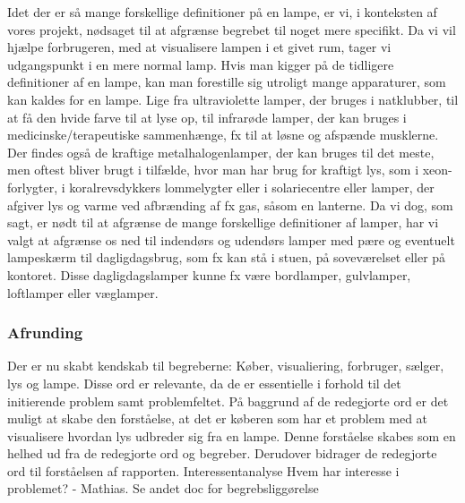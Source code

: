 Idet der er så mange forskellige definitioner på en lampe, er vi, i konteksten af vores projekt, nødsaget til at afgrænse begrebet til noget mere specifikt. Da vi vil hjælpe forbrugeren, med at visualisere lampen i et givet rum, tager vi udgangspunkt i en mere normal lamp. Hvis man kigger på de tidligere definitioner af en lampe, kan man forestille sig utroligt mange apparaturer, som kan kaldes for en lampe. Lige fra ultraviolette lamper, der bruges i natklubber, til at få den hvide farve til at lyse op, til infrarøde lamper, der kan bruges i medicinske/terapeutiske sammenhænge, fx til at løsne og afspænde musklerne. Der findes også de kraftige metalhalogenlamper, der kan bruges til det meste, men oftest bliver brugt i tilfælde, hvor man har brug for kraftigt lys, som i xeon-forlygter, i koralrevsdykkers lommelygter eller i solariecentre \cite{metal_lamper} eller lamper, der afgiver lys og varme ved afbrænding af fx gas, såsom en lanterne. Da vi dog, som sagt, er nødt til at afgrænse de mange forskellige definitioner af lamper, har vi valgt at afgrænse os ned til indendørs og udendørs lamper med pære og eventuelt lampeskærm til dagligdagsbrug, som fx kan stå i stuen, på soveværelset eller på kontoret. Disse dagligdagslamper kunne fx være bordlamper, gulvlamper, loftlamper eller væglamper. 

\subsubsection{Afrunding}
Der er nu skabt kendskab til begreberne: Køber, visualiering, forbruger, sælger,  lys og lampe. Disse ord er relevante, da de er essentielle i forhold til det initierende problem samt problemfeltet. På baggrund af de redegjorte ord er det muligt at skabe den forståelse, at det er køberen som har et problem med at visualisere hvordan lys udbreder sig fra en lampe. Denne forståelse skabes som en helhed ud fra de redegjorte ord og begreber. 
Derudover bidrager de redegjorte ord til forståelsen af rapporten.
Interessentanalyse
Hvem har interesse i problemet? - Mathias. Se andet doc for begrebsliggørelse
 


